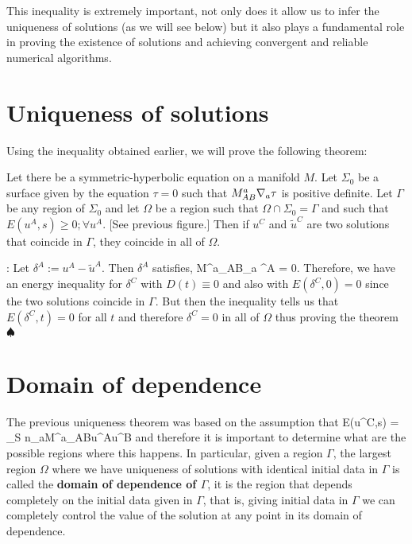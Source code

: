 This inequality is extremely important, not only does it allow us to infer the uniqueness of solutions 
(as we will see below) but it also plays a fundamental role in proving the existence of solutions and 
achieving convergent and reliable numerical algorithms.


\section{Uniqueness of solutions}

Using the inequality obtained earlier, we will prove the following theorem:

\bteo Let there be a symmetric-hyperbolic equation on a manifold $M$. 
Let $\Sigma_0$ be a surface given by the equation $\tau = 0$ such that $M^a_{AB}\nabla_a\tau$ is positive definite. 
Let $\Gamma$ be any region of $\Sigma_0$ and let $\Omega $ be a region such that 
$\Omega \cap \Sigma_0= \Gamma$ and such that $E(u^A,s) \geq 0 ;\forall u^A$. [See previous figure.] 
Then if $u^C$ and $\tilde{u}^C$ are two solutions that coincide in $\Gamma$, they coincide in all of $\Omega$. 
\eteo

\pru: Let $\delta^A := u^A - \tilde{u}^A$. Then $\delta^A$ satisfies, 
\beq 
M^a_{AB}\na_a \delta^A = 0. 
\eeq 
Therefore, we have an energy inequality for $\delta^C$ with $D(t) \equiv 0$ and also with $E(\delta^C,0)=0$ since the two solutions coincide in $\Gamma$. 
But then the inequality tells us that $E(\delta^C,t)=0$ for all $t$ and therefore $\delta^C=0$ in all of $\Omega$ thus proving the theorem $\spadesuit$


\section{Domain of dependence}

The previous uniqueness theorem was based on the assumption that \beq E(u^C,s) = \int_S n_aM^a_{AB}u^Au^B  \eeq and therefore it is important to determine what are the possible regions where this happens. In particular, given a region $\Gamma$, the largest region $\Omega$ where we have uniqueness of solutions with identical initial data in $\Gamma$ is called the {\bf domain of dependence of $\Gamma$}, it is the region that depends completely on the initial data given in $\Gamma$, that is, giving initial data in $\Gamma$ we can completely control the value of the solution at any point in its domain of dependence.

